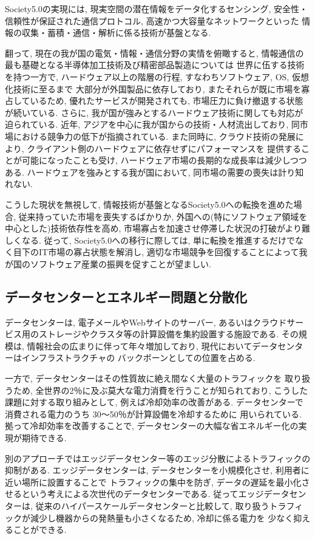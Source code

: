 Society5.0の実現には, 
現実空間の潜在情報をデータ化するセンシング, 
安全性・信頼性が保証された通信プロトコル, 
高速かつ大容量なネットワークといった
情報の収集・蓄積・通信・解析に係る技術が基盤となる.

翻って, 現在の我が国の電気・情報・通信分野の実情を俯瞰すると, 
情報通信の最も基礎となる半導体加工技術及び精密部品製造については
世界に伍する技術を持つ一方で, 
ハードウェア以上の階層の行程, 
すなわちソフトウェア, OS, 仮想化技術に至るまで
大部分が外国製品に依存しており,  
またそれらが既に市場を寡占しているため, 
優れたサービスが開発されても, 市場圧力に負け撤退する状態が続いている.
さらに, 我が国が強みとするハードウェア技術に関しても対応が迫られている.
近年, アジアを中心に我が国からの技術・人材流出しており, 
同市場における競争力の低下が指摘されている.
また同時に, クラウド技術の発展により, 
クライアント側のハードウェアに依存せずにパフォーマンスを
提供することが可能になったことも受け, 
ハードウェア市場の長期的な成長率は減少しつつある.
ハードウェアを強みとする我が国において, 
同市場の需要の喪失は計り知れない.

こうした現状を無視して, 
情報技術が基盤となるSociety5.0への転換を進めた場合, 
従来持っていた市場を喪失するばかりか, 
外国への(特にソフトウェア領域を中心とした)技術依存性を高め, 
市場寡占を加速させ停滞した状況の打破がより難しくなる. 
従って, Society5.0への移行に際しては, 
単に転換を推進するだけでなく目下のIT市場の寡占状態を解消し,   
適切な市場競争を回復することによって我が国のソフトウェア産業の振興を促すことが望ましい.
\subsection*{データセンターとエネルギー問題と分散化}
データセンターは, 電子メールやWebサイトのサーバー, 
あるいはクラウドサービス用のストレージやクラスタ等の計算設備を集約設置する施設である.
その規模は, 情報社会の広まりに伴って年々増加しており, 現代においてデータセンターはインフラストラクチャの
バックボーンとしての位置を占める.

一方で, データセンターはその性質故に絶え間なく大量のトラフィックを
取り扱うため, 全世界の2％に及ぶ莫大な電力消費を行うことが知られており, 
こうした課題に対する取り組みとして, 例えば冷却効率の改善がある.
データセンターで消費される電力のうち
30〜50％が計算設備を冷却するために
用いられている. 
拠って冷却効率を改善することで, データセンターの大幅な省エネルギー化の実現が期待できる.

別のアプローチではエッジデータセンター等のエッジ分散によるトラフィックの抑制がある. 
エッジデータセンターは, 
データセンターを小規模化させ, 利用者に近い場所に設置することで
トラフィックの集中を防ぎ, データの遅延を最小化させるという考えによる次世代のデータセンターである.
従ってエッジデータセンターは, 従来のハイパースケールデータセンターと比較して, 
取り扱うトラフィックが減少し機器からの発熱量も小さくなるため, 冷却に係る電力を
少なく抑えることができる.

